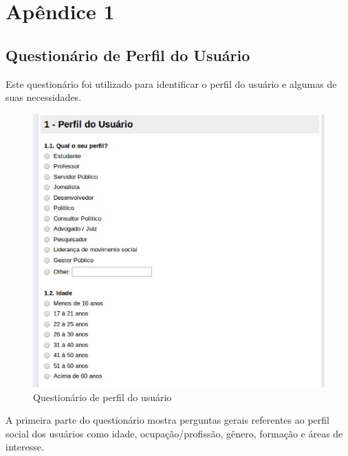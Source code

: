 \newpage
\appendix
\chapter{Apêndice 1}
\label{apendice1}
\section{Questionário de Perfil do Usuário}

	Este questionário foi utilizado para identificar o perfil do usuário e algumas de suas necessidades. 




\begin{figure}[h]
    \centering
    \includegraphics[keepaspectratio=true,scale=0.60]
      {figuras/perf1.eps}
	\caption{Questionário de perfil do usuário}
    \label{perfilgeral}
\end{figure}
%
%
\newpage


A primeira parte do questionário mostra perguntas gerais referentes ao perfil social dos usuários como idade, ocupação/profissão, gênero, formação  e áreas de interesse.



